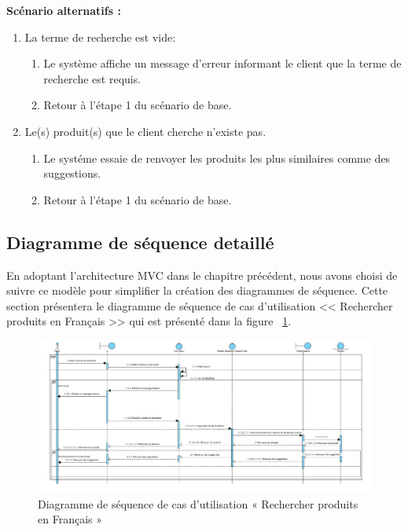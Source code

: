 \newpage
\textbf{Scénario alternatifs : }
\begin{enumerate}
	\item La terme de recherche est vide:
	      \begin{enumerate}
		      \item Le système affiche un message d'erreur informant le client que la terme de recherche est requis.
		      \item Retour à l'étape 1 du scénario de base.
	      \end{enumerate}

	\item Le(s) produit(s) que le client cherche n'existe pas.
	      \begin{enumerate}
		      \item Le systéme essaie de renvoyer les produits les plus similaires comme des suggestions.
		      \item Retour à l'étape 1 du scénario de base.
	      \end{enumerate}
\end{enumerate}

\subsection{Diagramme de séquence detaillé}
\noindent
En adoptant l'architecture MVC dans le chapitre précédent, nous avons choisi de
suivre ce modèle pour simplifier la création des diagrammes de séquence. Cette section
présentera le diagramme de séquence de cas d'utilisation << Rechercher produits en Français >> qui est présenté dans la figure ~\ref{fig:seqrecherchefrancais}.

\begin{figure}[H]
	\centering
	\includegraphics[width=1\textwidth]{logos/seqsprint1.png}
	\caption{Diagramme de séquence de cas d’utilisation « Rechercher produits en Français »}
	\label{fig:seqrecherchefrancais}
\end{figure}

